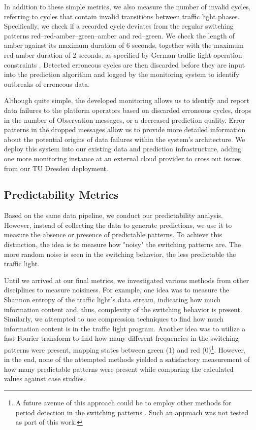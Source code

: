 In addition to these simple metrics, we also measure the number of invalid cycles, referring to cycles that contain invalid transitions between traffic light phases. Specifically, we check if a recorded cycle deviates from the regular switching patterns red--red-amber--green--amber and red--green. We check the length of amber against its maximum duration of 6 seconds, together with the maximum red-amber duration of 2 seconds, as specified by German traffic light operation constraints \cite{TN_libero_mab2}. Detected erroneous cycles are then discarded before they are input into the prediction algorithm and logged by the monitoring system to identify outbreaks of erroneous data.

Although quite simple, the developed monitoring allows us to identify and report data failures to the platform operators based on discarded erroneous cycles, drops in the number of Observation messages, or a decreased prediction quality. Error patterns in the dropped messages allow us to provide more detailed information about the potential origins of data failures within the system's architecture. We deploy this system into our existing data and prediction infrastructure, adding one more monitoring instance at an external cloud provider to cross out issues from our TU Dresden deployment.

\subsection{Predictability Metrics}

Based on the same data pipeline, we conduct our predictability analysis. However, instead of collecting the data to generate predictions, we use it to measure the absence or presence of predictable patterns. To achieve this distinction, the idea is to measure how "noisy" the switching patterns are. The more random noise is seen in the switching behavior, the less predictable the traffic light.

Until we arrived at our final metrics, we investigated various methods from other disciplines to measure noisiness. For example, one idea was to measure the Shannon entropy of the traffic light's data stream, indicating how much information content and, thus, complexity of the switching behavior is present. Similarly, we attempted to use compression techniques to find how much information content is in the traffic light program. Another idea was to utilize a fast Fourier transform to find how many different frequencies in the switching patterns were present, mapping states between green (1) and red (0)\footnote{A future avenue of this approach could be to employ other methods for period detection in the switching patterns \cite{breitenbach_method_2023}. Such an approach was not tested as part of this work.}. However, in the end, none of the attempted methods yielded a satisfactory measurement of how many predictable patterns were present while comparing the calculated values against case studies. 

